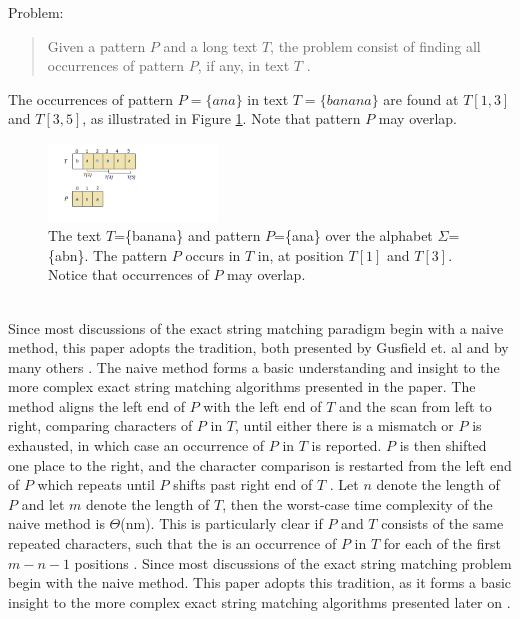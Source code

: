 \documentclass[12pt]{article} %
\begin{document}
Problem:
\begin{quote}
Given a pattern $P$ and a long text $T$, the problem consist of finding all occurrences of pattern $P$, if any, in text $T$ \cite{gusfield}.
\end{quote}
\newline
The occurrences of pattern $P=\{ana\}$ in text $T=\{banana\}$ are found at $T[1,3]$ and $T[3,5]$, as illustrated in Figure \ref{fig:banana}. Note that pattern $P$ may overlap.
\begin{figure}[h]
    \centering
    \includegraphics[width=0.4\textwidth]{1}
    \captionsetup{width=0.8\textwidth}
    \caption{The text $T$=\{banana\} and pattern $P$=\{ana\} over the alphabet $\Sigma$=\{abn\}. The pattern $P$ occurs in $T$ in, at position $T[1]$ and $T[3]$. Notice that occurrences of $P$ may overlap.}
    \label{fig:banana}
\end{figure}
\newline
\\ 
Since most discussions of the exact string matching paradigm begin with a naive method, this paper adopts the tradition, both presented by Gusfield et. al and by many others \cite{gusfield}. The naive method forms a basic understanding and insight to the more complex exact string matching algorithms presented in the paper. 
\newline
The method aligns the left end of $P$ with the left end of $T$ and the scan from left to right, comparing characters of $P$ in $T$, until either there is a mismatch or $P$ is exhausted, in which case an occurrence of $P$ in $T$ is reported. $P$ is then shifted one place to the right, and the character comparison is restarted from the left end of $P$ which repeats until $P$ shifts past right end of $T$ \cite{gusfield}.
\newline
Let $n$ denote the length of $P$ and let $m$ denote the length of $T$, then the worst-case time complexity of the naive method is $\Theta$(nm). This is particularly clear if $P$ and $T$ consists of the same repeated characters, such that the is an occurrence of $P$ in $T$ for each of the first $m - n - 1$ positions \cite{gusfield}.
\newline
Since most discussions of the exact string matching problem begin with the naive method. This paper adopts this tradition, as it forms a basic insight to the more complex exact string matching algorithms presented later on \cite{gusfield}.
\end{document}
